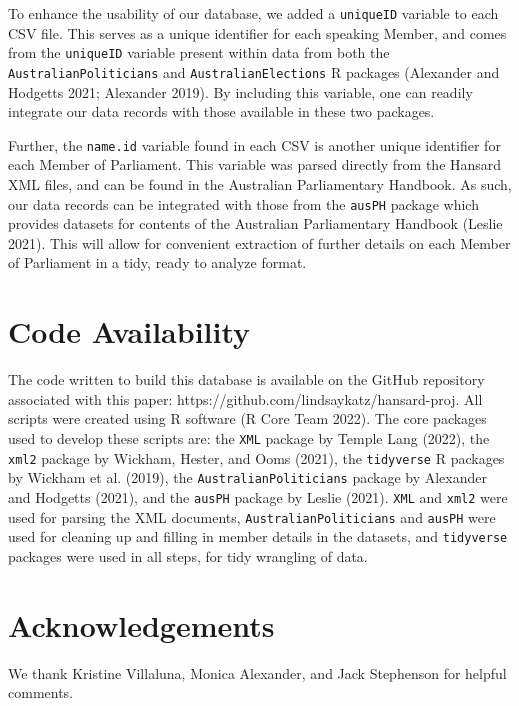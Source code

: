 \documentclass[
  letterpaper,
  DIV=11,
  numbers=noendperiod]{scrartcl}
\begin{document}
To enhance the usability of our database, we added a \texttt{uniqueID}
variable to each CSV file. This serves as a unique identifier for each
speaking Member, and comes from the \texttt{uniqueID} variable present
within data from both the \texttt{AustralianPoliticians} and
\texttt{AustralianElections} R packages (Alexander and Hodgetts 2021;
Alexander 2019). By including this variable, one can readily integrate
our data records with those available in these two packages.

Further, the \texttt{name.id} variable found in each CSV is another
unique identifier for each Member of Parliament. This variable was
parsed directly from the Hansard XML files, and can be found in the
Australian Parliamentary Handbook. As such, our data records can be
integrated with those from the \texttt{ausPH} package which provides
datasets for contents of the Australian Parliamentary Handbook (Leslie
2021). This will allow for convenient extraction of further details on
each Member of Parliament in a tidy, ready to analyze format.

\hypertarget{code-availability}{%
\section{Code Availability}\label{code-availability}}

The code written to build this database is available on the GitHub
repository associated with this paper:
https://github.com/lindsaykatz/hansard-proj. All scripts were created
using R software (R Core Team 2022). The core packages used to develop
these scripts are: the \texttt{XML} package by Temple Lang (2022), the
\texttt{xml2} package by Wickham, Hester, and Ooms (2021), the
\texttt{tidyverse} R packages by Wickham et al. (2019), the
\texttt{AustralianPoliticians} package by Alexander and Hodgetts (2021),
and the \texttt{ausPH} package by Leslie (2021). \texttt{XML} and
\texttt{xml2} were used for parsing the XML documents,
\texttt{AustralianPoliticians} and \texttt{ausPH} were used for cleaning
up and filling in member details in the datasets, and \texttt{tidyverse}
packages were used in all steps, for tidy wrangling of data.

\hypertarget{acknowledgements}{%
\section{Acknowledgements}\label{acknowledgements}}

We thank Kristine Villaluna, Monica Alexander, and Jack Stephenson for
helpful comments.
\end{document}
